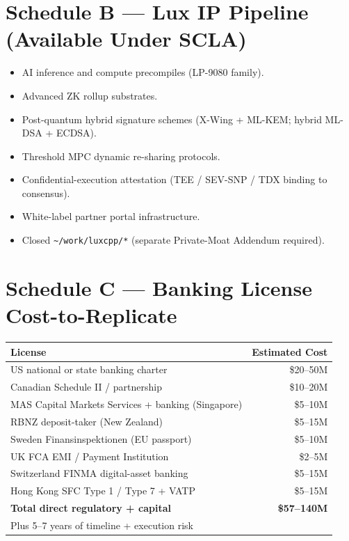 \documentclass[11pt,letterpaper]{article}
\begin{document}
\section*{Schedule B --- Lux IP Pipeline (Available Under SCLA)}

\begin{itemize}[leftmargin=1.5em,itemsep=0.1em]
\item AI inference and compute precompiles (LP-9080 family).
\item Advanced ZK rollup substrates.
\item Post-quantum hybrid signature schemes (X-Wing + ML-KEM; hybrid
ML-DSA + ECDSA).
\item Threshold MPC dynamic re-sharing protocols.
\item Confidential-execution attestation (TEE / SEV-SNP / TDX binding
to consensus).
\item White-label partner portal infrastructure.
\item Closed \texttt{\textasciitilde/work/luxcpp/*} (separate
Private-Moat Addendum required).
\end{itemize}

\section*{Schedule C --- Banking License Cost-to-Replicate}

\begin{center}
\begin{tabular}{lr}
\toprule
\textbf{License} & \textbf{Estimated Cost} \\
\midrule
US national or state banking charter & \$20--50M \\
Canadian Schedule II / partnership & \$10--20M \\
MAS Capital Markets Services + banking (Singapore) & \$5--10M \\
RBNZ deposit-taker (New Zealand) & \$5--15M \\
Sweden Finansinspektionen (EU passport) & \$5--10M \\
UK FCA EMI / Payment Institution & \$2--5M \\
Switzerland FINMA digital-asset banking & \$5--15M \\
Hong Kong SFC Type 1 / Type 7 + VATP & \$5--15M \\
\midrule
\textbf{Total direct regulatory + capital} & \textbf{\$57--140M} \\
Plus 5--7 years of timeline + execution risk & \\
\bottomrule
\end{tabular}
\end{center}
\end{document}
